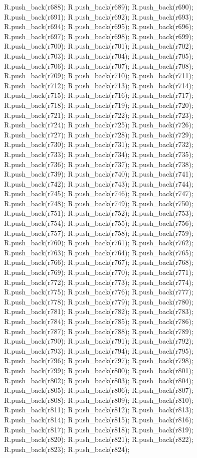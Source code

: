 \begin{DoxyCode}
{R.push_back(r688);
R.push_back(r689);
R.push_back(r690);
R.push_back(r691);
R.push_back(r692);
R.push_back(r693);
R.push_back(r694);
R.push_back(r695);
R.push_back(r696);
R.push_back(r697);
R.push_back(r698);
R.push_back(r699);
R.push_back(r700);
R.push_back(r701);
R.push_back(r702);
R.push_back(r703);
R.push_back(r704);
R.push_back(r705);
R.push_back(r706);
R.push_back(r707);
R.push_back(r708);
R.push_back(r709);
R.push_back(r710);
R.push_back(r711);
R.push_back(r712);
R.push_back(r713);
R.push_back(r714);
R.push_back(r715);
R.push_back(r716);
R.push_back(r717);
R.push_back(r718);
R.push_back(r719);
R.push_back(r720);
R.push_back(r721);
R.push_back(r722);
R.push_back(r723);
R.push_back(r724);
R.push_back(r725);
R.push_back(r726);
R.push_back(r727);
R.push_back(r728);
R.push_back(r729);
R.push_back(r730);
R.push_back(r731);
R.push_back(r732);
R.push_back(r733);
R.push_back(r734);
R.push_back(r735);
R.push_back(r736);
R.push_back(r737);
R.push_back(r738);
R.push_back(r739);
R.push_back(r740);
R.push_back(r741);
R.push_back(r742);
R.push_back(r743);
R.push_back(r744);
R.push_back(r745);
R.push_back(r746);
R.push_back(r747);
R.push_back(r748);
R.push_back(r749);
R.push_back(r750);
R.push_back(r751);
R.push_back(r752);
R.push_back(r753);
R.push_back(r754);
R.push_back(r755);
R.push_back(r756);
R.push_back(r757);
R.push_back(r758);
R.push_back(r759);
R.push_back(r760);
R.push_back(r761);
R.push_back(r762);
R.push_back(r763);
R.push_back(r764);
R.push_back(r765);
R.push_back(r766);
R.push_back(r767);
R.push_back(r768);
R.push_back(r769);
R.push_back(r770);
R.push_back(r771);
R.push_back(r772);
R.push_back(r773);
R.push_back(r774);
R.push_back(r775);
R.push_back(r776);
R.push_back(r777);
R.push_back(r778);
R.push_back(r779);
R.push_back(r780);
R.push_back(r781);
R.push_back(r782);
R.push_back(r783);
R.push_back(r784);
R.push_back(r785);
R.push_back(r786);
R.push_back(r787);
R.push_back(r788);
R.push_back(r789);
R.push_back(r790);
R.push_back(r791);
R.push_back(r792);
R.push_back(r793);
R.push_back(r794);
R.push_back(r795);
R.push_back(r796);
R.push_back(r797);
R.push_back(r798);
R.push_back(r799);
R.push_back(r800);
R.push_back(r801);
R.push_back(r802);
R.push_back(r803);
R.push_back(r804);
R.push_back(r805);
R.push_back(r806);
R.push_back(r807);
R.push_back(r808);
R.push_back(r809);
R.push_back(r810);
R.push_back(r811);
R.push_back(r812);
R.push_back(r813);
R.push_back(r814);
R.push_back(r815);
R.push_back(r816);
R.push_back(r817);
R.push_back(r818);
R.push_back(r819);
R.push_back(r820);
R.push_back(r821);
R.push_back(r822);
R.push_back(r823);
R.push_back(r824);
}
\end{DoxyCode}
